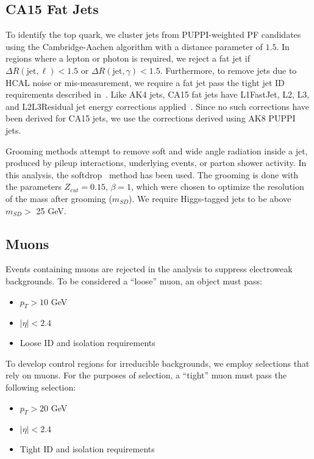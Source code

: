 \subsection{CA15 Fat Jets}\label{sec:fatjets}
To identify the top quark, we cluster jets from PUPPI-weighted PF candidates using the Cambridge-Aachen algorithm with a distance parameter of $1.5$. 
In regions where a lepton or photon is required, we reject a fat jet if $\Delta R(\text{jet},\ell)<1.5$ or $\Delta R(\text{jet},\gamma)<1.5$.
Furthermore, to remove jets due to HCAL noise or mis-measurement, we require a fat jet pass the tight jet ID requirements described in~\cite{CMS_AN_2016-473}.
Like AK4 jets, CA15 fat jets have L1FastJet, L2, L3, and L2L3Residual jet energy corrections applied~\cite{JEC_TWIKI}. 
Since no such corrections have been derived for CA15 jets, we use the corrections derived using AK8 PUPPI jets.

Grooming methods attempt to remove soft and wide angle radiation inside a jet, produced by pileup interactions, underlying events, or parton shower activity. In this analysis, the softdrop~\cite{msd} method has been used. The grooming is done with the parameters $Z_{cut} = 0.15$,  $\beta = 1$, which were chosen to optimize the resolution of the mass after grooming ($m_{SD}$). We require Higgs-tagged jets to be above $m_{SD} >$ 25 GeV.



\subsection{Muons}
\label{subsec:muons}

Events containing muons are rejected in the analysis to suppress electroweak backgrounds. 
To be considered a ``loose'' muon, an object must pass:
\begin{itemize}
  \item $p_T>10$ GeV
  \item $|\eta|<2.4$
  \item Loose ID and isolation requirements \cite{CMS-MUO-TWIKI-IDLOOSE}
\end{itemize}

To develop control regions for irreducible backgrounds, we employ selections that rely on muons.
For the purposes of selection, a ``tight'' muon must pass the following selection:
\begin{itemize}
  \item $p_T>20$ GeV
  \item $|\eta|<2.4$
  \item Tight ID and isolation requirements \cite{CMS-MUO-TWIKI-IDTIGHT}
\end{itemize}

